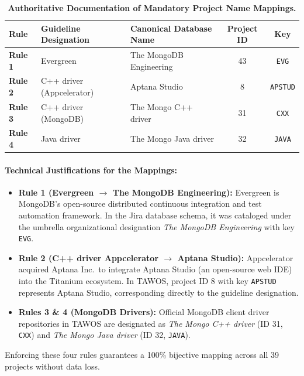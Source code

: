 \documentclass[11pt,a4paper]{article}
\begin{document}
\begin{table}[H]
\centering
\small
\caption{\textbf{Authoritative Documentation of Mandatory Project Name Mappings.}}
\label{tab:mappings}
\begin{tabularx}{\linewidth}{@{} l X X c c @{}}
\toprule
\textbf{Rule} & \textbf{Guideline Designation} & \textbf{Canonical Database Name} & \textbf{Project ID} & \textbf{Key} \\
\midrule
\textbf{Rule 1} & Evergreen & The MongoDB Engineering & 43 & \texttt{EVG} \\
\textbf{Rule 2} & C++ driver (Appcelerator) & Aptana Studio & 8 & \texttt{APSTUD} \\
\textbf{Rule 3} & C++ driver (MongoDB) & The Mongo C++ driver & 31 & \texttt{CXX} \\
\textbf{Rule 4} & Java driver & The Mongo Java driver & 32 & \texttt{JAVA} \\
\bottomrule
\end{tabularx}
\end{table}

\paragraph{Technical Justifications for the Mappings:}
\begin{itemize}
    \item \textbf{Rule 1 (Evergreen $\to$ The MongoDB Engineering):} Evergreen is MongoDB's open-source distributed continuous integration and test automation framework. In the Jira database schema, it was cataloged under the umbrella organizational designation \textit{The MongoDB Engineering} with key \texttt{EVG}.
    \item \textbf{Rule 2 (C++ driver Appcelerator $\to$ Aptana Studio):} Appcelerator acquired Aptana Inc.\ to integrate Aptana Studio (an open-source web IDE) into the Titanium ecosystem. In TAWOS, project ID 8 with key \texttt{APSTUD} represents Aptana Studio, corresponding directly to the guideline designation.
    \item \textbf{Rules 3 \& 4 (MongoDB Drivers):} Official MongoDB client driver repositories in TAWOS are designated as \textit{The Mongo C++ driver} (ID 31, \texttt{CXX}) and \textit{The Mongo Java driver} (ID 32, \texttt{JAVA}).
\end{itemize}

Enforcing these four rules guarantees a 100\% bijective mapping across all 39 projects without data loss.

\end{document}
